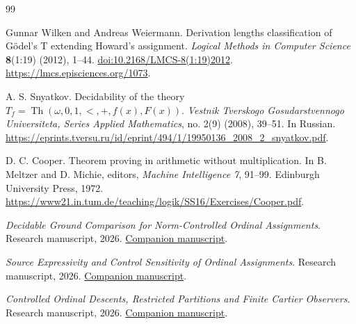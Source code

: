 \begin{thebibliography}{99}

Gunnar Wilken and Andreas Weiermann.
Derivation lengths classification of G\"odel's T extending Howard's assignment.
\emph{Logical Methods in Computer Science} \textbf{8}(1:19) (2012), 1--44.
\href{https://doi.org/10.2168/LMCS-8(1:19)2012}{doi:10.2168/LMCS-8(1:19)2012}.
\url{https://lmcs.episciences.org/1073}.

A. S. Snyatkov.
Decidability of the theory
$T_f=\operatorname{Th}(\omega,0,1,<,+,f(x),F(x))$.
\emph{Vestnik Tverskogo Gosudarstvennogo Universiteta,
Series Applied Mathematics}, no. 2(9) (2008), 39--51.  In Russian.
\url{https://eprints.tversu.ru/id/eprint/494/1/19950136_2008_2_snyatkov.pdf}.

D. C. Cooper. Theorem proving in arithmetic without multiplication.
In B. Meltzer and D. Michie, editors, \emph{Machine Intelligence 7},
91--99. Edinburgh University Press, 1972.
\url{https://www21.in.tum.de/teaching/logik/SS16/Exercises/Cooper.pdf}.

\emph{Decidable Ground Comparison for Norm-Controlled Ordinal Assignments}.
Research manuscript, 2026.
\href{https://github.com/avg-netizen/logic-lineages-papers/blob/papers/ii5-explanatory-2026-11-17/17-permitted-control-canonical-comparison/paper.pdf}{Companion manuscript}.

\emph{Source Expressivity and Control Sensitivity of Ordinal Assignments}.
Research manuscript, 2026.
\href{https://github.com/avg-netizen/logic-lineages-papers/blob/papers/ii5-explanatory-2026-11-17/19-source-expressivity-and-control-sensitivity/paper.pdf}{Companion manuscript}.

\emph{Controlled Ordinal Descents, Restricted Partitions and Finite Cartier Observers}.
Research manuscript, 2026.
\href{https://github.com/avg-netizen/logic-lineages-papers/blob/papers/ii5-explanatory-2026-11-17/20-controlled-descents-and-cartier-observers/paper.pdf}{Companion manuscript}.

\end{thebibliography}
